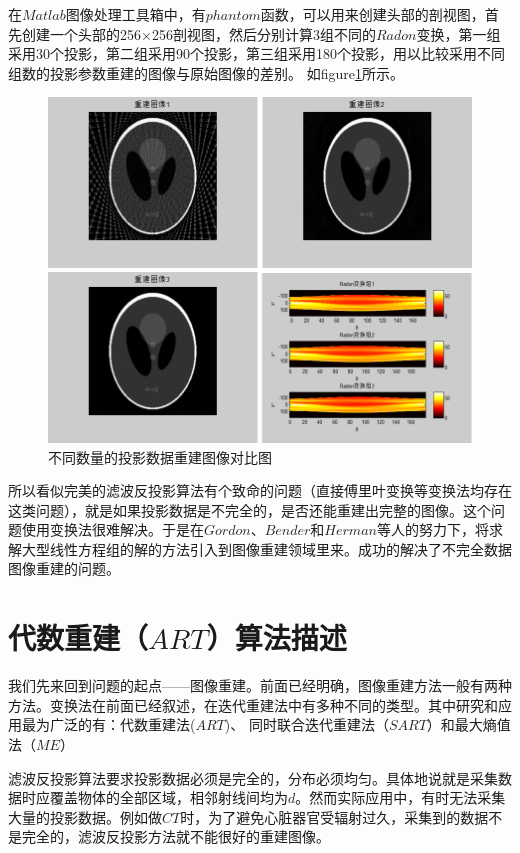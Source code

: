\documentclass[hyperref]{ctexart}
\begin{document}
		在$Matlab$图像处理工具箱中，有$phantom$函数，可以用来创建头部的剖视图，首先创建一个头部的256×256剖视图，然后分别计算3组不同的$Radon$变换，第一组采用30个投影，第二组采用90个投影，第三组采用180个投影，用以比较采用不同组数的投影参数重建的图像与原始图像的差别。 如figure\ref{对比}所示。
		\begin{figure}[ht!]
				\centering
				\includegraphics[width=150mm]{对比.png}
				\caption{不同数量的投影数据重建图像对比图 \label{对比}}
		\end{figure}

		所以看似完美的滤波反投影算法有个致命的问题（直接傅里叶变换等变换法均存在这类问题），就是如果投影数据是不完全的，是否还能重建出完整的图像。这个问题使用变换法很难解决。于是在$Gordon$、$Bender$和$Herman$等人的努力下，将求解大型线性方程组的解的方法引入到图像重建领域里来。成功的解决了不完全数据图像重建的问题。

	\section{代数重建（$ART$）算法描述}
		我们先来回到问题的起点——图像重建。前面已经明确，图像重建方法一般有两种方法。变换法在前面已经叙述，在迭代重建法中有多种不同的类型。其中研究和应用最为广泛的有：代数重建法($ART$)、 同时联合迭代重建法（$SART$）和最大熵值法（$ME$）

		滤波反投影算法要求投影数据必须是完全的，分布必须均匀。具体地说就是采集数据时应覆盖物体的全部区域，相邻射线间均为$d$。然而实际应用中，有时无法采集大量的投影数据。例如做$CT$时，为了避免心脏器官受辐射过久，采集到的数据不是完全的，滤波反投影方法就不能很好的重建图像。
\end{document}
